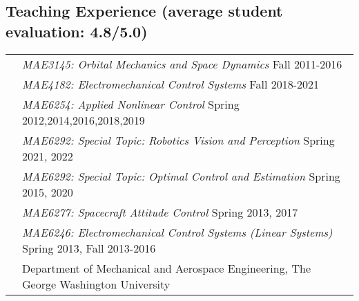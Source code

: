 \documentclass[10pt]{article}
\begin{document}
\subsection*{Teaching Experience \textnormal{\normalsize (average student evaluation: 4.8/5.0)}}
\begin{tabularx}{\textwidth}{>{\setlength{\hsize}{0.5cm}}X%
X}
&\textit{MAE3145: Orbital Mechanics and Space Dynamics} \hfill Fall 2011-2016\\
&\textit{MAE4182: Electromechanical Control Systems} \hfill Fall 2018-2021\\
&\textit{MAE6254: Applied Nonlinear Control} \hfill Spring 2012,2014,2016,2018,2019\\
&\textit{MAE6292: Special Topic: Robotics Vision and Perception} \hfill Spring 2021, 2022\\
&\textit{MAE6292: Special Topic: Optimal Control and Estimation} \hfill Spring 2015, 2020\\
&\textit{MAE6277: Spacecraft Attitude Control} \hfill Spring 2013, 2017\\
&\textit{MAE6246: Electromechanical Control Systems (Linear Systems)} \hfill Spring 2013, Fall 2013-2016\\
&Department of Mechanical and Aerospace Engineering, The George Washington University\vspace*{0.30cm}\\


\end{tabularx}
\end{document}
